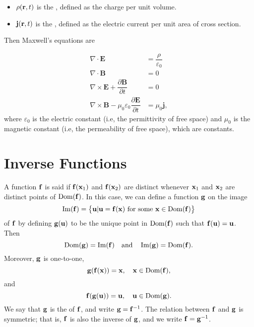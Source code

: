 \begin{df} \mbox{}
\begin{itemize}
 \item   $\rho(\mathbf{ r}, t)$ is the , defined as the charge per unit volume.
\item    $\mathbf{j}(\mathbf{ r}, t)$ is the , defined as the electric current per unit area of cross section.
\end{itemize}


\end{df}

Then Maxwell's equations are
\begin{df}
  \begin{align*}
    \nabla\cdot \mathbf{E} &= \dfrac{\rho}{\varepsilon_0}\\
    \nabla\cdot \mathbf{B} &= 0\\
    \nabla\times \mathbf{E} + \dfrac{\partial \mathbf{B}}{\partial t} &= 0\\
    \nabla\times \mathbf{B} - \mu_0\varepsilon_0 \dfrac{\partial \mathbf{E}}{\partial t} &= \mu_0 \mathbf{j},
  \end{align*}
  where $\varepsilon_0$ is the electric constant (i.e, the permittivity of free space) and $\mu_0$ is the magnetic constant (i.e, the permeability of free space), which are constants.
\end{df}





  \section{Inverse Functions} \label{sec:curvilinear}
   
 A function  $\mathbf{ f}$ is said  if $\mathbf{ f}(\mathbf{ x}_1)$ and $\mathbf{ f}(\mathbf{ x}_2)$ are
distinct whenever $\mathbf{ x}_1$ and $\mathbf{ x}_2$ are distinct points of
$\operatorname{Dom}(\mathbf{ f})$. In this case, we can define a function $\mathbf{ g}$ on the
image
$$
\operatorname{Im}(\mathbf{ f})=\set{\mathbf{u}|\mathbf{u}=\mathbf{ f}(\mathbf{ x})\mbox{ for
some }\mathbf{ x}\in \operatorname{Dom}(\mathbf{ f})}
$$
 of $\mathbf{ f}$ by defining $\mathbf{ g}(\mathbf{u})$
 to be the unique point in $\operatorname{Dom}(\mathbf{ f})$ such that
$\mathbf{ f}(\mathbf{u})
=\mathbf{u}$. Then
$$
\operatorname{Dom}(\mathbf{ g})=\operatorname{Im}(\mathbf{ f})\mbox{\quad and\quad} \operatorname{Im}(\mathbf{ g})=\operatorname{Dom}(\mathbf{ f}).
$$
Moreover, $\mathbf{ g}$ is one-to-one,
$$
\mathbf{ g}(\mathbf{ f}(\mathbf{ x}))=\mathbf{ x},\quad \mathbf{ x}\in \operatorname{Dom}(\mathbf{ f}),
$$
and
$$
\mathbf{ f}(\mathbf{ g}(\mathbf{u}))=\mathbf{u},\quad \mathbf{u}\in \operatorname{Dom}(\mathbf{ g}).
$$
We say that $\mathbf{ g}$ is the  of $\mathbf{ f}$, and
 write $\mathbf{ g}=\mathbf{ f}^{-1}$. The relation between
$\mathbf{ f}$ and $\mathbf{ g}$ is symmetric; that is, $\mathbf{ f}$ is
also the
inverse of $\mathbf{ g}$, and we  write $\mathbf{ f}= \mathbf{ g}^{-1}$.


